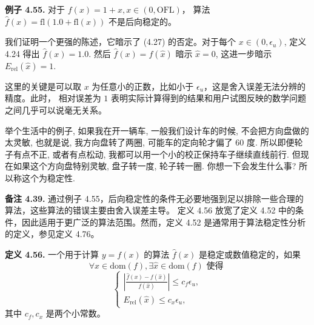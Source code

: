 \documentclass[a4paper]{ctexart}
\begin{document}
{\noindent \textbf{例子 4.55.} 对于 $f(x) = 1 + x, x \in (0, \text{OFL})$，
算法 $\hat{f}(x) = \text{fl}(1.0 + \text{fl}(x))$ 不是后向稳定的。

我们证明一个更强的陈述，它暗示了 (4.27) 的否定。对于每个 $x \in (0, \epsilon_u)$, 定义 4.24 得出 $\hat{f}(x) = 1.0$.
然后 $\hat{f}(x) = f(\hat{x})$ 暗示 $\hat{x} = 0$, 这进一步暗示 $E_{\text{rel}}(\hat{x}) = 1$.

这里的关键是可以取 $x$ 为任意小的正数，比如小于 $\epsilon_u$，这是舍入误差无法分辨的精度。此时，
相对误差为 $1$ 表明实际计算得到的结果和用户试图反映的数学问题之间几乎可以说毫无关系。




举个生活中的例子, 如果我在开一辆车, 一般我们设计车的时候, 不会把方向盘做的太灵敏,
也就是说, 我方向盘转了两圈, 可能车的定向轮才偏了 60 度. 所以即便轮子有点不正,
或者有点松动, 我都可以用一个小的校正保持车子继续直线前行. 但现在如果这个方向盘特别灵敏,
盘子转一度, 轮子转一圈. 你想一下会发生什么事? 所以称这个为稳定性.

\noindent \textbf{备注 4.39.} 通过例子 4.55，后向稳定性的条件无必要地强到足以排除一些合理的算法，这些算法的错误主要由舍入误差主导。
定义 4.56 放宽了定义 4.52 中的条件，因此适用于更广泛的算法范围。然而，定义 4.52 是通常用于算法稳定性分析的定义，参见定义 4.76。

\textbf{定义 4.56.} 一个用于计算 $y = f(x)$ 的算法 $\hat{f}(x)$ 是稳定或数值稳定的，如果
\[
\forall x \in \text{dom}(f), \exists \hat{x} \in \text{dom}(f) \text{ 使得 }
\]
\[
\left\{
\begin{array}{l}
\left|\frac{\hat{f}(x) - f(\hat{x})}{f(\hat{x})}\right| \leq c_f \epsilon_u, \\
E_{\text{rel}}(\hat{x}) \leq c_x \epsilon_u,
\end{array}
\right. \tag{4.29}
\]
其中 $c_f, c_x$ 是两个小常数。

}
\end{document}
